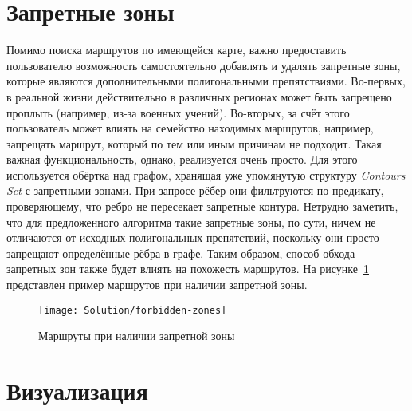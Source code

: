 \FloatBarrier

\section{Запретные зоны}

\label{sec:forbidden-zones}

Помимо поиска маршрутов по имеющейся карте, важно предоставить
пользователю возможность самостоятельно добавлять и удалять запретные
зоны, которые являются дополнительными полигональными препятствиями.
Во-первых, в реальной жизни действительно в различных регионах может
быть запрещено проплыть (например, из-за военных учений). Во-вторых,
за счёт этого пользователь может влиять на семейство находимых
маршрутов, например, запрещать маршрут, который по тем или иным
причинам не подходит. Такая важная функциональность, однако,
реализуется очень просто. Для этого используется обёртка над графом,
хранящая уже упомянутую структуру \emph{Contours Set} с запретными
зонами. При запросе рёбер они фильтруются по предикату, проверяющему,
что ребро не пересекает запретные контура. Нетрудно заметить, что для
предложенного алгоритма такие запретные зоны, по сути, ничем не
отличаются от исходных полигональных препятствий, поскольку они просто
запрещают определённые рёбра в графе. Таким образом, способ обхода
запретных зон также будет влиять на похожесть маршрутов. На
рисунке~\ref{fig:forbidden} представлен пример маршрутов при наличии
запретной зоны.

\begin{figure}
    \begin{center}
        \texttt{[image: Solution/forbidden-zones]}
    \end{center}
    \caption{Маршруты при наличии запретной зоны}
    \label{fig:forbidden}
\end{figure}

\FloatBarrier

\section{Визуализация}

\label{sec:visualization-impl}

